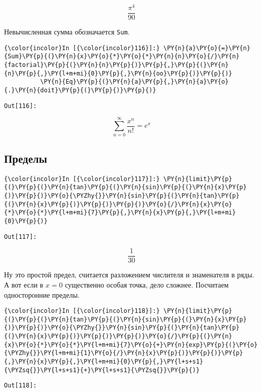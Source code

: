     \[\frac{\pi^{4}}{90}\]

    

    Невычисленная сумма обозначается \texttt{Sum}.

    \begin{Verbatim}[commandchars=\\\{\}]
{\color{incolor}In [{\color{incolor}116}]:} \PY{n}{a}\PY{o}{=}\PY{n}{Sum}\PY{p}{(}\PY{n}{x}\PY{o}{*}\PY{o}{*}\PY{n}{n}\PY{o}{/}\PY{n}{factorial}\PY{p}{(}\PY{n}{n}\PY{p}{)}\PY{p}{,}\PY{p}{(}\PY{n}{n}\PY{p}{,}\PY{l+m+mi}{0}\PY{p}{,}\PY{n}{oo}\PY{p}{)}\PY{p}{)}
          \PY{n}{Eq}\PY{p}{(}\PY{n}{a}\PY{p}{,}\PY{n}{a}\PY{o}{.}\PY{n}{doit}\PY{p}{(}\PY{p}{)}\PY{p}{)}
\end{Verbatim}
\texttt{\color{outcolor}Out[{\color{outcolor}116}]:}
    
    \[\sum_{n=0}^{\infty} \frac{x^{n}}{n!} = e^{x}\]

    

\subsection{Пределы}
\label{sympy10}

    \begin{Verbatim}[commandchars=\\\{\}]
{\color{incolor}In [{\color{incolor}117}]:} \PY{n}{limit}\PY{p}{(}\PY{p}{(}\PY{n}{tan}\PY{p}{(}\PY{n}{sin}\PY{p}{(}\PY{n}{x}\PY{p}{)}\PY{p}{)}\PY{o}{\PYZhy{}}\PY{n}{sin}\PY{p}{(}\PY{n}{tan}\PY{p}{(}\PY{n}{x}\PY{p}{)}\PY{p}{)}\PY{p}{)}\PY{o}{/}\PY{n}{x}\PY{o}{*}\PY{o}{*}\PY{l+m+mi}{7}\PY{p}{,}\PY{n}{x}\PY{p}{,}\PY{l+m+mi}{0}\PY{p}{)}
\end{Verbatim}
\texttt{\color{outcolor}Out[{\color{outcolor}117}]:}
    
    \[\frac{1}{30}\]

    

    Ну это простой предел, считается разложением числителя и знаменателя в
ряды. А вот если в \(x=0\) существенно особая точка, дело сложнее.
Посчитаем односторонние пределы.

    \begin{Verbatim}[commandchars=\\\{\}]
{\color{incolor}In [{\color{incolor}118}]:} \PY{n}{limit}\PY{p}{(}\PY{p}{(}\PY{n}{tan}\PY{p}{(}\PY{n}{sin}\PY{p}{(}\PY{n}{x}\PY{p}{)}\PY{p}{)}\PY{o}{\PYZhy{}}\PY{n}{sin}\PY{p}{(}\PY{n}{tan}\PY{p}{(}\PY{n}{x}\PY{p}{)}\PY{p}{)}\PY{p}{)}\PY{o}{/}\PY{p}{(}\PY{n}{x}\PY{o}{*}\PY{o}{*}\PY{l+m+mi}{7}\PY{o}{+}\PY{n}{exp}\PY{p}{(}\PY{o}{\PYZhy{}}\PY{l+m+mi}{1}\PY{o}{/}\PY{n}{x}\PY{p}{)}\PY{p}{)}\PY{p}{,}\PY{n}{x}\PY{p}{,}\PY{l+m+mi}{0}\PY{p}{,}\PY{l+s+s1}{\PYZsq{}}\PY{l+s+s1}{+}\PY{l+s+s1}{\PYZsq{}}\PY{p}{)}
\end{Verbatim}
\texttt{\color{outcolor}Out[{\color{outcolor}118}]:}
    
